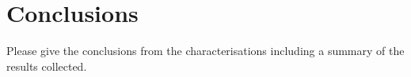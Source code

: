 
\section{Conclusions}
\label{sec:conclusions}
Please give the conclusions from the characterisations
including a summary of the results collected.
